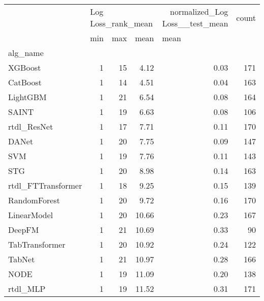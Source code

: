 \begin{tabular}{lrrrrr}
\toprule
{} & \multicolumn{3}{l}{Log Loss_rank_mean} & normalized_Log Loss__test_mean & count \\
{} &                min & max &   mean & \multicolumn{2}{l}{mean} \\
alg_name           &                    &     &        &                                &       \\
\midrule
XGBoost            &                  1 &  15 &   4.12 &                           0.03 &   171 \\
CatBoost           &                  1 &  14 &   4.51 &                           0.04 &   163 \\
LightGBM           &                  1 &  21 &   6.54 &                           0.08 &   164 \\
SAINT              &                  1 &  19 &   6.63 &                           0.08 &   106 \\
rtdl_ResNet        &                  1 &  17 &   7.71 &                           0.11 &   170 \\
DANet              &                  1 &  20 &   7.75 &                           0.09 &   147 \\
SVM                &                  1 &  19 &   7.76 &                           0.11 &   143 \\
STG                &                  1 &  20 &   8.98 &                           0.14 &   163 \\
rtdl_FTTransformer &                  1 &  18 &   9.25 &                           0.15 &   139 \\
RandomForest       &                  1 &  20 &   9.72 &                           0.16 &   170 \\
LinearModel        &                  1 &  20 &  10.66 &                           0.23 &   167 \\
DeepFM             &                  1 &  21 &  10.69 &                           0.33 &    90 \\
TabTransformer     &                  1 &  20 &  10.92 &                           0.24 &   122 \\
TabNet             &                  1 &  21 &  10.97 &                           0.28 &   166 \\
NODE               &                  1 &  19 &  11.09 &                           0.20 &   138 \\
rtdl_MLP           &                  1 &  19 &  11.52 &                           0.31 &   171 \\

\end{tabular}
